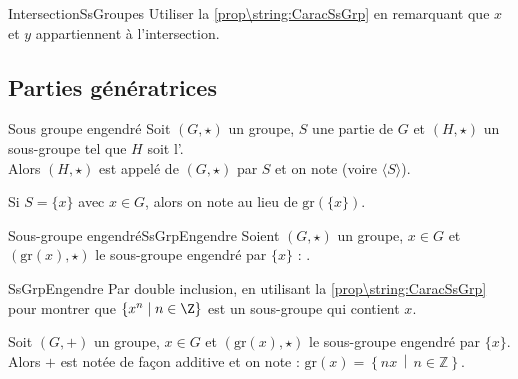 \documentclass[12pt,a4paper]{report}
\begin{document}
    \begin{principedemo}{IntersectionSsGroupes}
    Utiliser la \cref{prop\string:CaracSsGrp}  en remarquant que $x$ et $y$ appartiennent à l'intersection.
    \end{principedemo}
    
    
    \subsection{Parties génératrices}
    
    \begin{definition}{Sous groupe engendré}{}
    Soit $(G, \star)$ un groupe, $S$ une partie de $G$ et $(H, \star)$ un sous-groupe tel que $H$ soit l'.\\
    Alors $(H, \star)$ est appelé  de $(G, \star)$  par $S$ et on note  (voire $\langle S \rangle$).
    \end{definition}
    
    \begin{remarque}
    Si $S = \lbrace x \rbrace$ avec $x \in G$, alors on note  au lieu de $\text{gr}\left(\lbrace x \rbrace\right)$.
    \end{remarque}
    
    \begin{proposition}{Sous-groupe engendré}{SsGrpEngendre}
     Soient $(G, \star)$ un groupe, $x \in G$ et $(\text{gr}(x), \star)$ le sous-groupe engendré par $\lbrace x \rbrace$ : .
    \end{proposition}
    
    \begin{principedemo}{SsGrpEngendre}
    Par double inclusion, en utilisant la \cref{prop\string:CaracSsGrp}  pour montrer que $\{x^n \mid n \in \Z\}$ est un sous-groupe qui contient $x$.
    \end{principedemo}
    
    \begin{remarque}
    Soit $(G, +)$ un groupe, $x \in G$ et $(\text{gr}(x), \star)$ le sous-groupe engendré par $\{x\}$.\\
    Alors $+$ est notée de façon additive et on note : $\text{gr}(x) = \left\lbrace nx \,\middle|\, n \in \mathbb{Z} \right\rbrace$.
    \end{remarque}
    
\end{document}
